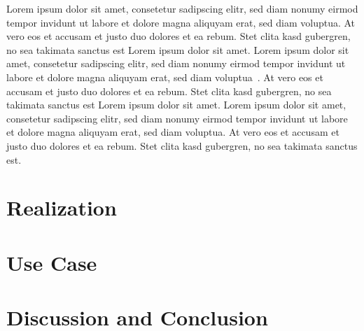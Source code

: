 \documentclass[review]{vgtc}                 %
\begin{document}
Lorem ipsum dolor sit amet, consetetur sadipscing elitr, sed diam
nonumy eirmod tempor invidunt ut labore et dolore magna aliquyam erat,
sed diam voluptua. At vero eos et accusam et justo duo dolores et ea
rebum. Stet clita kasd gubergren, no sea takimata sanctus est Lorem
ipsum dolor sit amet. Lorem ipsum dolor sit amet, consetetur
sadipscing elitr, sed diam nonumy eirmod tempor invidunt ut labore et
dolore magna aliquyam erat, sed diam
voluptua~\cite{Kitware:2003,Max:1995:OMF}. At vero eos et accusam et
justo duo dolores et ea rebum. Stet clita kasd gubergren, no sea
takimata sanctus est Lorem ipsum dolor sit amet. Lorem ipsum dolor sit
amet, consetetur sadipscing elitr, sed diam nonumy eirmod tempor
invidunt ut labore et dolore magna aliquyam erat, sed diam
voluptua. At vero eos et accusam et justo duo dolores et ea
rebum. Stet clita kasd gubergren, no sea takimata sanctus est.

\section{Realization}

\section{Use Case}

\section{Discussion and Conclusion}


%

%
%
%


\end{document}
